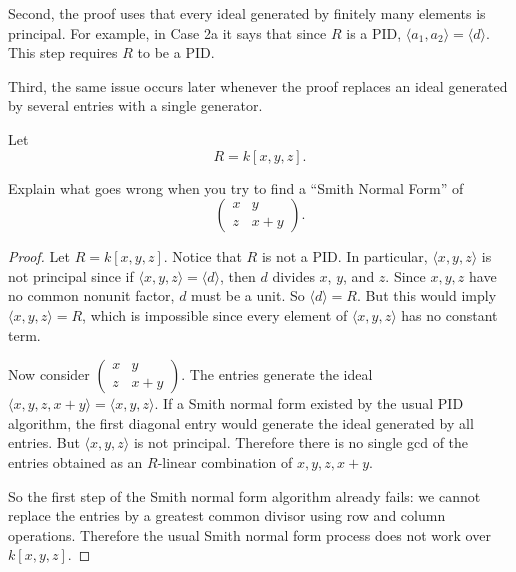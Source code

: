 \documentclass[addpoints,10pt]{exam}
\theoremstyle{plain}
\theoremstyle{definition}
\newtheorem{prob}[thm]{Problem}
\theoremstyle{plain}
\theoremstyle{plain}
\theoremstyle{definition}
\let\oldprob\prob
\let\endoldprob\endprob
\renewenvironment{prob}
  {\begin{singlespace}\oldprob}
  {\endoldprob\end{singlespace}}
\begin{document}
Second, the proof uses that every ideal generated by finitely many
elements is principal. For example, in Case 2a it says that since $R$ is
a PID, $\langle a_1,a_2\rangle=\langle d\rangle$. This step requires
$R$ to be a PID.

Third, the same issue occurs later whenever the proof replaces an ideal
generated by several entries with a single generator.

\newpage

\begin{prob}
Let
\[
R=k[x,y,z].
\]

Explain what goes wrong when you try to find a ``Smith Normal Form'' of
\[
\begin{pmatrix}
x & y\\
z & x+y
\end{pmatrix}.
\]
\end{prob}

\begin{proof}
Let $R=k[x,y,z]$. Notice that $R$ is not a PID. In particular,
$\langle x,y,z\rangle$ is not principal since if
$\langle x,y,z\rangle=\langle d\rangle$, then $d$ divides $x$, $y$, and
$z$. Since $x,y,z$ have no common nonunit factor, $d$ must be a unit.
So $\langle d\rangle=R$. But this would imply
$\langle x,y,z\rangle=R$, which is impossible since every element of
$\langle x,y,z\rangle$ has no constant term.

Now consider
$\begin{pmatrix}x&y\\ z&x+y\end{pmatrix}$. The entries generate the
ideal $\langle x,y,z,x+y\rangle=\langle x,y,z\rangle$. If a Smith normal
form existed by the usual PID algorithm, the first diagonal entry would
generate the ideal generated by all entries. But
$\langle x,y,z\rangle$ is not principal. Therefore there is no single
gcd of the entries obtained as an $R$-linear combination of
$x,y,z,x+y$.

So the first step of the Smith normal form algorithm already fails:
we cannot replace the entries by a greatest common divisor using row and
column operations. Therefore the usual Smith normal form process does not
work over $k[x,y,z]$.

\end{proof}

\newpage
\end{document}
